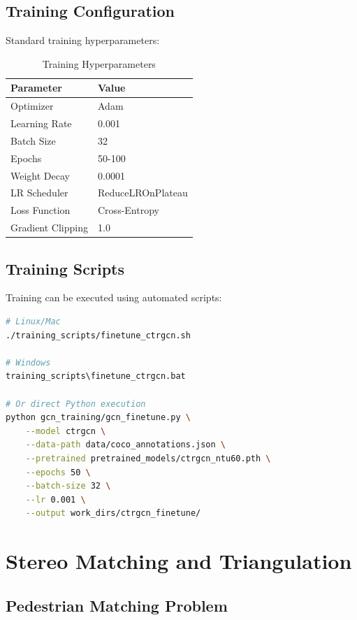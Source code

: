 \documentclass[11pt,a4paper]{article}
\begin{document}
\subsection{Training Configuration}

Standard training hyperparameters:

\begin{table}[h]
\centering
\caption{Training Hyperparameters}
\begin{tabular}{ll}
\toprule
\textbf{Parameter} & \textbf{Value} \\
\midrule
Optimizer & Adam \\
Learning Rate & 0.001 \\
Batch Size & 32 \\
Epochs & 50-100 \\
Weight Decay & 0.0001 \\
LR Scheduler & ReduceLROnPlateau \\
Loss Function & Cross-Entropy \\
Gradient Clipping & 1.0 \\
\bottomrule
\end{tabular}
\end{table}

\subsection{Training Scripts}

Training can be executed using automated scripts:

\begin{lstlisting}[language=bash, caption=Fine-tuning CTR-GCN Model]
# Linux/Mac
./training_scripts/finetune_ctrgcn.sh

# Windows
training_scripts\finetune_ctrgcn.bat

# Or direct Python execution
python gcn_training/gcn_finetune.py \
    --model ctrgcn \
    --data-path data/coco_annotations.json \
    --pretrained pretrained_models/ctrgcn_ntu60.pth \
    --epochs 50 \
    --batch-size 32 \
    --lr 0.001 \
    --output work_dirs/ctrgcn_finetune/
\end{lstlisting}

\section{Stereo Matching and Triangulation}

\subsection{Pedestrian Matching Problem}
\end{document}
